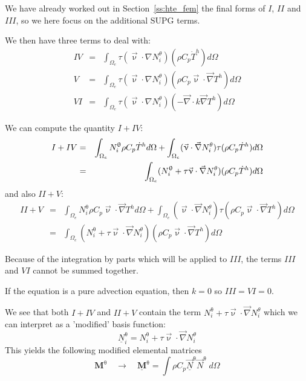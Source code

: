We have already worked out in Section~\ref{ss:hte_fem} the final forms of $I$, $II$ and 
$III$, so we here focus on the additional SUPG terms. 
  
We then have three terms to deal with:
\begin{eqnarray}
IV &=&\int_{\Omega_e} \tau(\vec\upnu\cdot\nabla N_i^\theta) (\rho C_p\dot{T}^h)  d\Omega \\
V  &=&\int_{\Omega_e} \tau(\vec\upnu\cdot\nabla N_i^\theta)(\rho C_p{\vec \upnu}\cdot{\vec\nabla T^h}) d\Omega \\
VI &=&\int_{\Omega_e} \tau(\vec\upnu\cdot\nabla N_i^\theta)(-{\vec \nabla} \cdot k \vec\nabla T^h ) d\Omega 
\end{eqnarray}

We can compute the quantity $I+IV$:
\begin{eqnarray}
I+IV 
&=&
\int_{\Omega_e} N^\uptheta_i  \rho C_p \dot{T}^h d\Omega 
+
\int_{\Omega_e}(\vec\upnu\cdot\vec\nabla N_i^\theta)  \tau ( \rho C_p\dot{T}^h)  d\Omega \nonumber\\
&=& 
\int_{\Omega_e} ( N^\uptheta_i + \tau \vec\upnu\cdot\vec\nabla N_i^\theta )  ( \rho C_p\dot{T}^h)  d\Omega 
\end{eqnarray}
and also $II+V$:
\begin{eqnarray}
II+V 
&=&
\int_{\Omega_e} N^\uptheta_i  \rho C_p  {\vec \upnu}\cdot {\vec\nabla T^h}   d\Omega
+
\int_{\Omega_e}(\vec\upnu\cdot\vec\nabla N_i^\theta) \tau (\rho C_p {\vec \upnu}\cdot{\vec\nabla T^h}) d\Omega \\
&=& 
\int_{\Omega_e} (N^\uptheta_i  + \tau \vec\upnu\cdot\vec\nabla N_i^\theta) (\rho C_p {\vec \upnu}\cdot{\vec\nabla T^h}) d\Omega 
\end{eqnarray}

\begin{remark} Because of the integration by parts which 
will be applied to  $III$, the terms $III$ and $VI$ cannot be summed together.
\end{remark}


\begin{remark}
If the equation is a pure advection equation, then $k=0$ so $III=VI=0$. 
\end{remark}


We see that both $I+IV$ and $II+V$ contain the term $N^\uptheta_i  + \tau \vec\upnu\cdot\vec\nabla N_i^\theta$
which we can interpret as a 'modified' basis function:
\[
\boxed{
\underline{N}^\uptheta_i = N^\uptheta_i  + \tau \vec\upnu\cdot\vec\nabla N_i^\theta
}
\]
This yields the following modified elemental matrices
\[
{\bm M}^\uptheta \quad \rightarrow \quad \underline{\bm M}^\uptheta
= \int \rho C_p \vec{\underline{N}}^\uptheta \vec{N}^\uptheta \; d\Omega
\]

